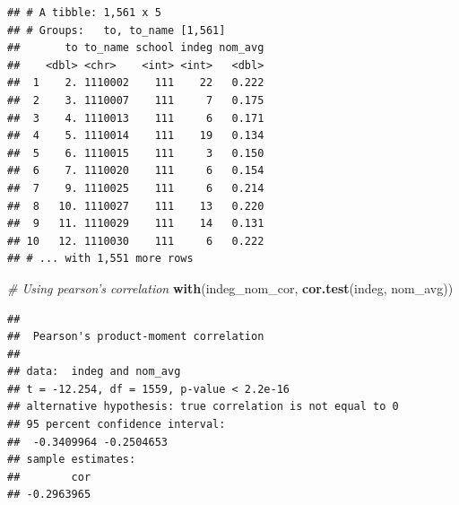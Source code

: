 \documentclass[]{book}
\newenvironment{Shaded}{\begin{snugshade}}{\end{snugshade}}
\newcommand{\KeywordTok}[1]{\textcolor[rgb]{0.13,0.29,0.53}{\textbf{#1}}}
\newcommand{\DataTypeTok}[1]{\textcolor[rgb]{0.13,0.29,0.53}{#1}}
\newcommand{\DecValTok}[1]{\textcolor[rgb]{0.00,0.00,0.81}{#1}}
\newcommand{\StringTok}[1]{\textcolor[rgb]{0.31,0.60,0.02}{#1}}
\newcommand{\CommentTok}[1]{\textcolor[rgb]{0.56,0.35,0.01}{\textit{#1}}}
\newcommand{\OperatorTok}[1]{\textcolor[rgb]{0.81,0.36,0.00}{\textbf{#1}}}
\newcommand{\NormalTok}[1]{#1}
\theoremstyle{definition}
\theoremstyle{definition}
\theoremstyle{definition}
\theoremstyle{remark}
\begin{document}
\begin{Shaded}
\end{Shaded}

\begin{verbatim}
## # A tibble: 1,561 x 5
## # Groups:   to, to_name [1,561]
##       to to_name school indeg nom_avg
##    <dbl> <chr>    <int> <int>   <dbl>
##  1    2. 1110002    111    22   0.222
##  2    3. 1110007    111     7   0.175
##  3    4. 1110013    111     6   0.171
##  4    5. 1110014    111    19   0.134
##  5    6. 1110015    111     3   0.150
##  6    7. 1110020    111     6   0.154
##  7    9. 1110025    111     6   0.214
##  8   10. 1110027    111    13   0.220
##  9   11. 1110029    111    14   0.131
## 10   12. 1110030    111     6   0.222
## # ... with 1,551 more rows
\end{verbatim}

\begin{Shaded}
\begin{Highlighting}[]
\CommentTok{# Using pearson's correlation}
\KeywordTok{with}\NormalTok{(indeg_nom_cor, }\KeywordTok{cor.test}\NormalTok{(indeg, nom_avg))}
\end{Highlighting}
\end{Shaded}

\begin{verbatim}
## 
##  Pearson's product-moment correlation
## 
## data:  indeg and nom_avg
## t = -12.254, df = 1559, p-value < 2.2e-16
## alternative hypothesis: true correlation is not equal to 0
## 95 percent confidence interval:
##  -0.3409964 -0.2504653
## sample estimates:
##        cor 
## -0.2963965
\end{verbatim}
\end{document}
